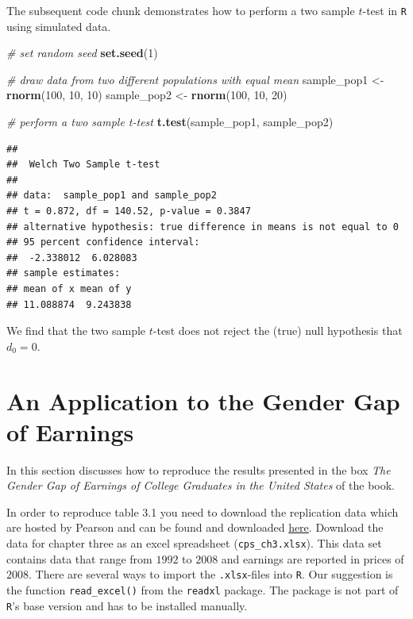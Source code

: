 \documentclass[]{book}
\newenvironment{Shaded}{\begin{snugshade}}{\end{snugshade}}
\newcommand{\KeywordTok}[1]{\textcolor[rgb]{0.13,0.29,0.53}{\textbf{#1}}}
\newcommand{\DecValTok}[1]{\textcolor[rgb]{0.00,0.00,0.81}{#1}}
\newcommand{\StringTok}[1]{\textcolor[rgb]{0.31,0.60,0.02}{#1}}
\newcommand{\CommentTok}[1]{\textcolor[rgb]{0.56,0.35,0.01}{\textit{#1}}}
\newcommand{\NormalTok}[1]{#1}
\theoremstyle{definition}
\theoremstyle{definition}
\theoremstyle{definition}
\theoremstyle{remark}
\begin{document}
The subsequent code chunk demonstrates how to perform a two sample
\(t\)-test in \texttt{R} using simulated data.

\begin{Shaded}
\begin{Highlighting}[]
\CommentTok{# set random seed}
\KeywordTok{set.seed}\NormalTok{(}\DecValTok{1}\NormalTok{)}

\CommentTok{# draw data from two different populations with equal mean}
\NormalTok{sample_pop1 <-}\StringTok{ }\KeywordTok{rnorm}\NormalTok{(}\DecValTok{100}\NormalTok{, }\DecValTok{10}\NormalTok{, }\DecValTok{10}\NormalTok{)}
\NormalTok{sample_pop2 <-}\StringTok{ }\KeywordTok{rnorm}\NormalTok{(}\DecValTok{100}\NormalTok{, }\DecValTok{10}\NormalTok{, }\DecValTok{20}\NormalTok{)}

\CommentTok{# perform a two sample t-test}
\KeywordTok{t.test}\NormalTok{(sample_pop1, sample_pop2)}
\end{Highlighting}
\end{Shaded}

\begin{verbatim}
## 
##  Welch Two Sample t-test
## 
## data:  sample_pop1 and sample_pop2
## t = 0.872, df = 140.52, p-value = 0.3847
## alternative hypothesis: true difference in means is not equal to 0
## 95 percent confidence interval:
##  -2.338012  6.028083
## sample estimates:
## mean of x mean of y 
## 11.088874  9.243838
\end{verbatim}

We find that the two sample \(t\)-test does not reject the (true) null
hypothesis that \(d_0 = 0\).

\section{An Application to the Gender Gap of
Earnings}\label{an-application-to-the-gender-gap-of-earnings}

In this section discusses how to reproduce the results presented in the
box \emph{The Gender Gap of Earnings of College Graduates in the United
States} of the book.

In order to reproduce table 3.1 you need to download the replication
data which are hosted by Pearson and can be found and downloaded
\href{http://wps.aw.com/aw_stock_ie_3/178/45691/11696965.cw/index.html}{here}.
Download the data for chapter three as an excel spreadsheet
(\texttt{cps\_ch3.xlsx}). This data set contains data that range from
\(1992\) to \(2008\) and earnings are reported in prices of \(2008\).
There are several ways to import the \texttt{.xlsx}-files into
\texttt{R}. Our suggestion is the function \texttt{read\_excel()} from
the \texttt{readxl} package. The package is not part of \texttt{R}'s
base version and has to be installed manually.
\end{document}
